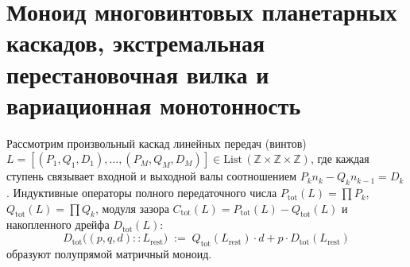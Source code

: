\section{Моноид многовинтовых планетарных каскадов, экстремальная перестановочная вилка и вариационная монотонность}

Рассмотрим произвольный каскад линейных передач (винтов) $L = [(P_1, Q_1, D_1), \dots, (P_M, Q_M, D_M)] \in \mathrm{List}\,(\mathbb{Z}\times\mathbb{Z}\times\mathbb{Z})$, где каждая ступень связывает входной и выходной валы соотношением $P_k n_k - Q_k n_{k-1} = D_k$. Индуктивные операторы полного передаточного числа $P_{\mathrm{tot}}(L) = \prod P_k$, $Q_{\mathrm{tot}}(L) = \prod Q_k$, модуля зазора $C_{\mathrm{tot}}(L) = P_{\mathrm{tot}}(L) - Q_{\mathrm{tot}}(L)$ и накопленного дрейфа $D_{\mathrm{tot}}(L)$:
\begin{equation}
  \label{eq:math-multiscrew-d-rec}
  D_{\mathrm{tot}}\bigl((p, q, d) :: L_{\mathrm{rest}}\bigr)
  \;:=\;
  Q_{\mathrm{tot}}(L_{\mathrm{rest}})\cdot d + p\cdot D_{\mathrm{tot}}(L_{\mathrm{rest}})
\end{equation}
образуют полупрямой матричный моноид.

